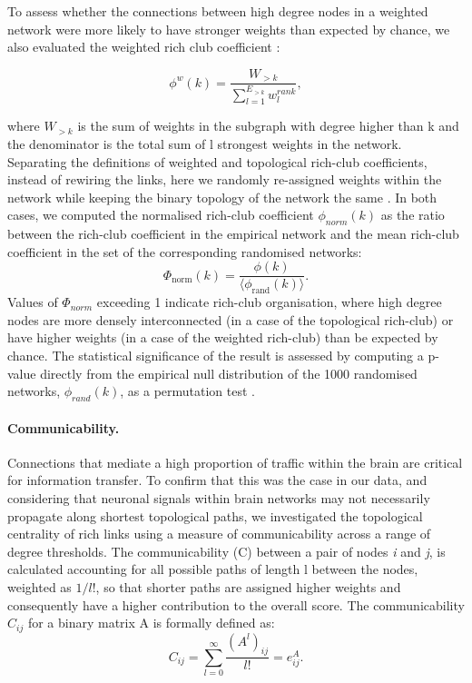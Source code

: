 To assess whether the connections between high degree nodes in a weighted network were more likely to have stronger weights than expected by chance, we also evaluated the weighted rich club coefficient \citep{Opsahl2008}:

\begin{equation}
    \label{eqn:Ch5Eq2}
    \phi^{w}(k) = \frac{W_{>k}}{\sum_{l=1}^{E_{>k}}w^{rank}_{l}},
\end{equation}

where $W_{>k}$ is the sum of weights in the subgraph with degree higher than k and the denominator is the total sum of l strongest weights in the network. Separating the definitions of weighted and topological rich-club coefficients, instead of rewiring the links, here we randomly re-assigned weights within the network while keeping the binary topology of the network the same \citep{Alstott2014}. In both cases, we computed the normalised rich-club coefficient $\phi_{norm}(k)$ as the ratio between the rich-club coefficient in the empirical network and the mean rich-club coefficient in the set of the corresponding randomised networks:
\begin{equation}
    \label{eqn:Ch5Eq3}
    \Phi_\mathrm{norm}(k) = \frac{\phi(k)}{\langle \phi_\mathrm{rand}(k) \rangle}.
\end{equation}
Values of $\Phi_{norm}$ exceeding 1 indicate rich-club organisation, where high degree nodes are more densely interconnected (in a case of the topological rich-club) or have higher weights (in a case of the weighted rich-club) than be expected by chance. The statistical significance of the result is assessed by computing a p-value directly from the empirical null distribution of the 1000 randomised networks, $\phi_{rand}(k)$, as a permutation test \citep{VandenHeuvel2011}.

\paragraph*{Communicability.}

Connections that mediate a high proportion of traffic within the brain are critical for information transfer. To confirm that this was the case in our data, and considering that neuronal signals within brain networks may not necessarily propagate along shortest topological paths, we investigated the topological centrality of rich links using a measure of communicability \citep{Estrada2008} across a range of degree thresholds. The communicability (C) between a pair of nodes \textit{i} and \textit{j}, is calculated accounting for all possible paths of length l between the nodes, weighted as $1/l!$, so that shorter paths are assigned higher weights and consequently have a higher contribution to the overall score. The communicability $C_{ij}$ for a binary matrix A is formally defined as:
\begin{equation}
    \label{eqn:Ch5Eq4}
    C_{ij}= \sum_{l=0}^{\infty}\frac{(A^{l})_{ij}}{l!} = e^{A}_{ij}.
\end{equation}

